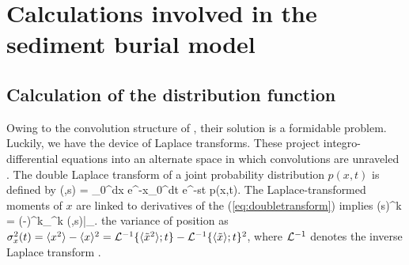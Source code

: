 

\chapter{Calculations involved in the sediment burial model}


\section{Calculation of the distribution function}
\label{sec:appendixA}

Owing to the convolution structure  of \DIFdelbegin {}\DIFdelend \DIFaddbegin {}\DIFaddend , their solution is a formidable problem.
Luckily, we have the device of Laplace transforms.
These project integro-differential equations into an alternate space in which convolutions are unraveled \DIFdelbegin {}\DIFdelend \DIFaddbegin {}\DIFaddend .
The double Laplace transform of a joint probability distribution $p(x,t)$ is defined by 
\be {}(\eta,s) = \int_0^\infty dx e^{-\eta x}\int_0^\infty dt e^{-st} p(x,t). \label{eq:doubletransform}\ee
The Laplace-transformed moments of $x$ are linked to derivatives of the \DIFdelbegin {}\DIFdelend \DIFaddbegin {}\DIFaddend (\ref{eq:doubletransform}) implies
\be \bra {}(s)^k \ket = (-)^k\partial_\eta^k (\eta,s)\Big|_{}.\label{eq:momenttrick}\ee
\DIFdelbegin {}\DIFdelend \DIFaddbegin {}\DIFaddend the variance of position \DIFaddbegin {}\DIFaddend as $\sigma_x^2(t) = \langle x^2 \rangle - \langle x \rangle^2 = \mathcal{L}^{-1} \{\langle\tilde{x}^2 \rangle;t\} - \mathcal{L}^{-1} \{\langle\tilde{x} \rangle;t\}^2$, where $\mathcal{L}^{-1}$ denotes the inverse Laplace transform \DIFdelbegin {}\DIFdelend \DIFaddbegin {}\DIFaddend .

